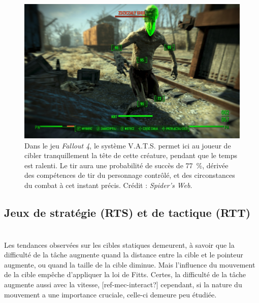 	\begin{figure}[ht]
		\centering
		\includegraphics[width=\textwidth]{figures/f4vats}
		\caption{Dans le jeu \emph{Fallout 4}, le système V.A.T.S. permet ici au joueur de cibler tranquillement la tête de cette créature, pendant que le temps est ralenti. Le tir aura une probabilité de succès de 77~\%{}, dérivée des compétences de tir du personnage contrôlé, et des circonstances du combat à cet instant précis. Crédit : \emph{Spider's Web}.}
		\label{fig:f4vats}
	\end{figure}
	
	\subsection{Jeux de stratégie (RTS) et de tactique (RTT)}
	
	
	
	\section{}    
	Les tendances observées sur les cibles statiques demeurent, à savoir que la difficulté de la tâche augmente quand la distance entre la cible et le pointeur augmente, ou quand la taille de la cible diminue. Mais l'influence du mouvement de la cible empêche d'appliquer la loi de Fitts. Certes, la difficulté de la tâche augmente aussi avec la vitesse, [ref-mec-interact?] cependant, si la nature du mouvement a une importance cruciale, celle-ci demeure peu étudiée.
    
    
    
